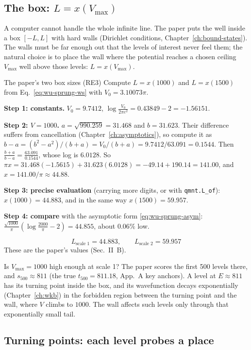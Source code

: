 \subsection{The box: $L=x(V_{\max})$}

A computer cannot handle the whole infinite line. The paper puts the well inside a box $[-L,L]$ with hard walls (Dirichlet conditions, Chapter~\ref{ch:bound-states}). The walls must be far enough out that the levels of interest never feel them; the natural choice is to place the wall where the potential reaches a chosen ceiling $V_{\max}$ well above those levels: $L=x(V_{\max})$.

\begin{sample}{The paper's two box sizes (RE3)}
Compute $L=x(1000)$ and $L=x(1500)$ from Eq.~\eqref{eq:wu-sprung-ws} with $V_0=3.10073\pi$.

\textbf{Step 1: constants.} $V_0=9.7412$, $\log\frac{V_0}{2\pi e^2}=0.43849-2=-1.56151$.

\textbf{Step 2: $V=1000$.} $a=\sqrt{990.259}=31.468$ and $b=31.623$. Their difference suffers from cancellation (Chapter~\ref{ch:asymptotics}), so compute it as $b-a=(b^2-a^2)/(b+a)=V_0/(b+a)=9.7412/63.091=0.1544$. Then $\frac{b+a}{b-a}=\frac{63.091}{0.1544}$, whose log is $6.0128$. So $\pi x=31.468(-1.5615)+31.623(6.0128)=-49.14+190.14=141.00$, and $x=141.00/\pi\approx44.88$.

\textbf{Step 3: precise evaluation} (carrying more digits, or with \texttt{qmnt.L\_of}): $x(1000)=44.883$, and in the same way $x(1500)=59.957$.

\textbf{Step 4: compare} with the asymptotic form \eqref{eq:wu-sprung-asym}: $\frac{\sqrt{1000}}{\pi}(\log\frac{2000}{\pi}-2)=44.855$, about $0.06\%$ low.

\[
\boxed{L_{\text{scale 1}}=44.883,\qquad L_{\text{scale 2}}=59.957}
\]
These are the paper's values (Sec.~II~B).
\end{sample}

Is $V_{\max}=1000$ high enough at scale 1? The paper scores the first 500 levels there, and $s_{500}\approx811$ (the true $t_{500}=811.18$, App.~A key anchors). A level at $E\approx811$ has its turning point inside the box, and its wavefunction decays exponentially (Chapter~\ref{ch:wkb}) in the forbidden region between the turning point and the wall, where $V$ climbs to $1000$. The wall affects such levels only through that exponentially small tail.

\subsection{Turning points: each level probes a place}

